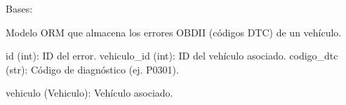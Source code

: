 \documentclass[letterpaper,10pt,spanish]{sphinxmanual}
\begin{document}
\begin{fulllineitems}
\label{\detokenize{endpoints:main.ErrorVehiculo}}
\pysigstartsignatures
\pysiglinewithargsret
{}
{}
{}
\pysigstopsignatures
\sphinxAtStartPar
Bases: {\hyperref[\detokenize{modelos:main.Base}]{}}

\sphinxAtStartPar
Modelo ORM que almacena los errores OBD\sphinxhyphen{}II (códigos DTC) de un vehículo.
\begin{description}
\sphinxAtStartPar
id (int): ID del error.
vehiculo\_id (int): ID del vehículo asociado.
codigo\_dtc (str): Código de diagnóstico (ej. P0301).

\sphinxAtStartPar
vehiculo (Vehiculo): Vehículo asociado.

\end{description}

\begin{fulllineitems}
\label{\detokenize{endpoints:main.ErrorVehiculo.codigo_dtc}}
\pysigstartsignatures
\pysigline
{}
\pysigstopsignatures
\end{fulllineitems}


\begin{fulllineitems}
\label{\detokenize{endpoints:main.ErrorVehiculo.id}}
\pysigstartsignatures
\pysigline
{}
\pysigstopsignatures
\end{fulllineitems}


\begin{fulllineitems}
\label{\detokenize{endpoints:main.ErrorVehiculo.vehiculo}}
\pysigstartsignatures
\pysigline
{}
\pysigstopsignatures
\end{fulllineitems}


\begin{fulllineitems}
\label{\detokenize{endpoints:main.ErrorVehiculo.vehiculo_id}}
\pysigstartsignatures
\pysigline
{}
\pysigstopsignatures
\end{fulllineitems}


\end{fulllineitems}
\end{document}
